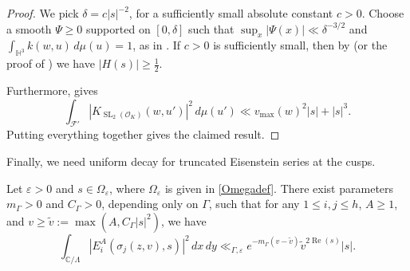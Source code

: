 \documentclass[12pt,reqno]{amsart}
\numberwithin{equation}{section}
\renewcommand{\Re}{\operatorname{Re}}
\newcommand{\C}{\mathbb{C}}
\DeclareMathOperator{\SL}{SL}
\begin{document}
\begin{proof}
    We pick $\delta = c|s|^{-2}$, for a sufficiently small absolute constant $c>0$. Choose a smooth $\Psi \geq 0$ supported on $[0, \delta]$ such that $\sup_x |{\Psi(x)}| \ll \delta^{-3/2}$ and $\int_{\mathbb{H}^3} k(w, u) \, d\mu(u) = 1$, as in \cite[\S 6.4, (4.37)]{EGM}. If $c>0$ is sufficiently small, then by \cite[Lemma 7.5]{SarCoh_chapt7} (or the proof of \cite[\S 3.5, Lemma 5.6]{EGM}) we have $|H(s)| \geq \frac{1}{2}$. 
    
    Furthermore, \cite[\S 6.4, Lemma 4.9]{EGM} gives
    \begin{equation*}
        \int_\mathcal{F'} |{K_{\SL_2(\mathcal{O}_K)}(w, u')}|^2 \, d\mu(u') \ll v_\mathrm{max}(w)^2 |s| + |s|^3.
    \end{equation*}
    Putting everything together gives the claimed result.
\end{proof}

Finally, we need uniform decay for truncated Eisenstein series at the cusps.

\begin{lemma}\label{lemma:truncated_Eis_decay}
  Let $\varepsilon > 0$ and $s \in \Omega_{\varepsilon}$, where $\Omega_{\varepsilon}$ is given in \eqref{Omegadef}. There exist parameters $m_{\Gamma} > 0$ and $C_{\Gamma}>0$, depending only on $\Gamma$, such that for any $1\leq i, j \leq h$, $A \geq 1$, and $v \geq \widetilde{v} := \max(A, C_{\Gamma} |s|^2)$, we have
    \begin{equation*}
        \int_{\C / \Lambda} |{E_i^A(\sigma_j (z, v), s)}|^2 \, dx \, dy \ll_{\Gamma, \varepsilon} e^{-m_\Gamma (v - \widetilde{v})} \widetilde{v}^{2 \Re(s)} |{s}|.
    \end{equation*}
\end{lemma}
\end{document}
